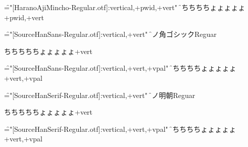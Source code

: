 \font\f="[HaranoAjiMincho-Regular.otf]:vertical,+pwid,+vert"
\f
ちちちちちょょょょょ+pwid,+vert

\font\f="[SourceHanSans-Regular.otf]:vertical,+vert"
\f
源ノ角ゴシックReguar

ちちちちちょょょょょ+vert

\font\f="[SourceHanSans-Regular.otf]:vertical,+vert,+vpal"
\f

ちちちちちょょょょょ+vert,+vpal

\font\f="[SourceHanSerif-Regular.otf]:vertical,+vert"
\f
源ノ明朝Reguar

ちちちちちょょょょょ+vert

\font\f="[SourceHanSerif-Regular.otf]:vertical,+vert,+vpal"
\f

ちちちちちょょょょょ+vert,+vpal

\bye
